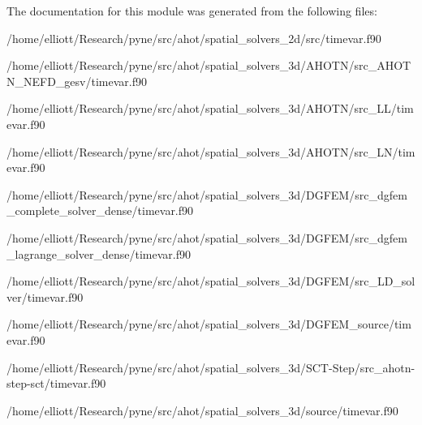 The documentation for this module was generated from the following files\-:\begin{DoxyCompactItemize}
\item 
/home/elliott/\-Research/pyne/src/ahot/spatial\-\_\-solvers\-\_\-2d/src/timevar.\-f90\item 
/home/elliott/\-Research/pyne/src/ahot/spatial\-\_\-solvers\-\_\-3d/\-A\-H\-O\-T\-N/src\-\_\-\-A\-H\-O\-T\-N\-\_\-\-N\-E\-F\-D\-\_\-gesv/timevar.\-f90\item 
/home/elliott/\-Research/pyne/src/ahot/spatial\-\_\-solvers\-\_\-3d/\-A\-H\-O\-T\-N/src\-\_\-\-L\-L/timevar.\-f90\item 
/home/elliott/\-Research/pyne/src/ahot/spatial\-\_\-solvers\-\_\-3d/\-A\-H\-O\-T\-N/src\-\_\-\-L\-N/timevar.\-f90\item 
/home/elliott/\-Research/pyne/src/ahot/spatial\-\_\-solvers\-\_\-3d/\-D\-G\-F\-E\-M/src\-\_\-dgfem\-\_\-complete\-\_\-solver\-\_\-dense/timevar.\-f90\item 
/home/elliott/\-Research/pyne/src/ahot/spatial\-\_\-solvers\-\_\-3d/\-D\-G\-F\-E\-M/src\-\_\-dgfem\-\_\-lagrange\-\_\-solver\-\_\-dense/timevar.\-f90\item 
/home/elliott/\-Research/pyne/src/ahot/spatial\-\_\-solvers\-\_\-3d/\-D\-G\-F\-E\-M/src\-\_\-\-L\-D\-\_\-solver/timevar.\-f90\item 
/home/elliott/\-Research/pyne/src/ahot/spatial\-\_\-solvers\-\_\-3d/\-D\-G\-F\-E\-M\-\_\-source/timevar.\-f90\item 
/home/elliott/\-Research/pyne/src/ahot/spatial\-\_\-solvers\-\_\-3d/\-S\-C\-T-\/\-Step/src\-\_\-ahotn-\/step-\/sct/timevar.\-f90\item 
/home/elliott/\-Research/pyne/src/ahot/spatial\-\_\-solvers\-\_\-3d/source/timevar.\-f90\end{DoxyCompactItemize}
